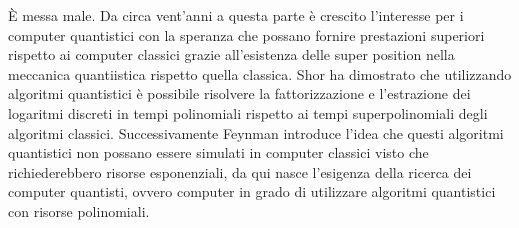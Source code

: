 È messa male.
Da circa vent'anni a questa parte è crescito l'interesse per i computer quantistici con la speranza che possano fornire prestazioni superiori rispetto ai computer classici grazie all'esistenza delle super position nella meccanica quantiistica rispetto quella classica. Shor ha dimostrato che utilizzando algoritmi quantistici è possibile risolvere la fattorizzazione e l'estrazione dei logaritmi discreti in tempi polinomiali rispetto ai tempi superpolinomiali degli algoritmi classici. Successivamente Feynman introduce l'idea che questi algoritmi quantistici non possano essere simulati in computer classici visto che richiederebbero risorse esponenziali, da qui nasce l'esigenza della ricerca dei computer quantisti, ovvero computer in grado di utilizzare algoritmi quantistici con risorse polinomiali.
